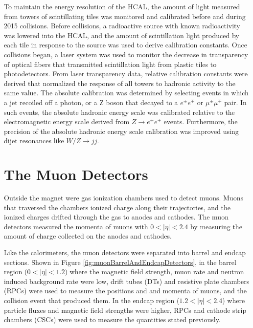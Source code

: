 To maintain the energy resolution of the HCAL, the amount of light measured from towers of scintillating tiles 
was monitored and calibrated before and during 2015 collisions.  Before collisions, a radioactive source 
with known radioactivity was lowered into the HCAL, and the amount of scintillation light produced by each tile 
in response to the source was used to derive calibration constants.  Once collisions began, a laser system 
was used to monitor the decrease in transparency of optical fibers that transmitted scintillation light 
from plastic tiles to photodetectors.  From laser transparency data, relative calibration constants were 
derived that normalized the response of all towers to hadronic activity to the same value.  The absolute 
calibration was determined by selecting events in which a jet recoiled off a photon, or a Z boson that 
decayed to a $e^{\pm}e^{\mp}$ or $\mu^{\pm}\mu^{\mp}$ pair.  In such events, the absolute hadronic energy 
scale was calibrated relative to the electromagnetic energy scale derived from $Z \rightarrow e^{\pm}e^{\mp}$ 
events.  Furthermore, the precision of the absolute hadronic energy scale calibration was improved using 
dijet resonances like $W/Z \rightarrow jj$.

\section{The Muon Detectors}
\label{sec:muonDetectorsDescription}
Outside the magnet were gas ionization chambers used to detect muons.  Muons that traversed the chambers 
ionized charge along their trajectories, and the ionized charges drifted through the gas to anodes and 
cathodes.  The muon detectors measured the momenta of muons with $0 < |\eta| < 2.4$ by measuring the amount of 
charge collected on the anodes and cathodes.

Like the calorimeters, the muon detectors were separated into barrel and endcap sections.  Shown in Figure \ref{fig:muonBarrelAndEndcapDetectors}, in the barrel 
region ($0 < |\eta| < 1.2$) where the magnetic field strength, muon rate and neutron induced background 
rate were low, drift tubes (DTs) and resistive plate chambers (RPCs) were used to measure the positions and 
and momenta of muons, and the collision event that produced them.  In the endcap region ($1.2 < |\eta| < 2.4$) where 
particle fluxes and magnetic field strengths were higher, RPCs and cathode strip chambers (CSCs) were used 
to measure the quantities stated previously.

